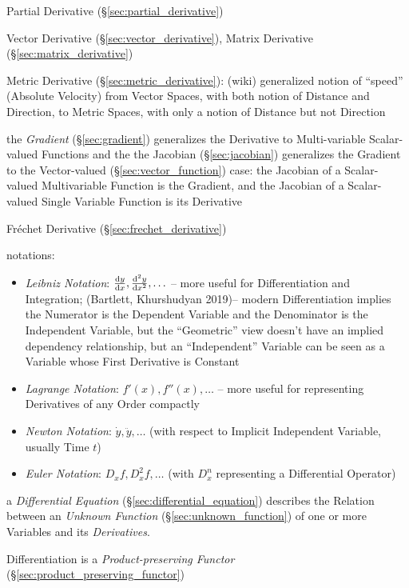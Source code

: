 {\asterism

\fist Partial Derivative (\S\ref{sec:partial_derivative})

\fist Vector Derivative (\S\ref{sec:vector_derivative}), Matrix Derivative
(\S\ref{sec:matrix_derivative})

\fist Metric Derivative (\S\ref{sec:metric_derivative}): (wiki) generalized
notion of ``speed'' (Absolute Velocity) from Vector Spaces, with both notion of
Distance and Direction, to Metric Spaces, with only a notion of Distance but not
Direction

\fist the \emph{Gradient} (\S\ref{sec:gradient}) generalizes the Derivative to
Multi-variable Scalar-valued Functions and the the Jacobian
(\S\ref{sec:jacobian}) generalizes the Gradient to the Vector-valued
(\S\ref{sec:vector_function}) case: the Jacobian of a Scalar-valued
Multivariable Function is the Gradient, and the Jacobian of a Scalar-valued
Single Variable Function is its Derivative

\fist Fr\'echet Derivative (\S\ref{sec:frechet_derivative})

notations:
\begin{itemize}
  \item \emph{Leibniz Notation}: $\frac{\mathrm{d}y}{\mathrm{d}x}, \frac{\mathrm{d}^2{y}}{\mathrm{d}x^2}, \ldots$
    -- more useful for Differentiation and Integration;
    (Bartlett, Khurshudyan 2019)-- modern Differentiation implies the Numerator
    is the Dependent Variable and the Denominator is the Independent Variable,
    but the ``Geometric'' view doesn't have an implied dependency relationship,
    but an ``Independent'' Variable can be seen as a Variable whose First
    Derivative is Constant
  \item \emph{Lagrange Notation}: $f'(x), f''(x), \ldots$
    -- more useful for representing Derivatives of any Order compactly
  \item \emph{Newton Notation}: $\dot{y}, \ddot{y}, \ldots$ (with respect to
    Implicit Independent Variable, usually Time $t$)
  \item \emph{Euler Notation}: $D_x{f}, D^2_x{f}, \ldots$ (with $D_x^n$
    representing a Differential Operator)
\end{itemize}

\fist a \emph{Differential Equation} (\S\ref{sec:differential_equation})
describes the Relation between an \emph{Unknown Function}
(\S\ref{sec:unknown_function}) of one or more Variables and its
\emph{Derivatives}.

Differentiation is a \emph{Product-preserving Functor}
(\S\ref{sec:product_preserving_functor})

}
